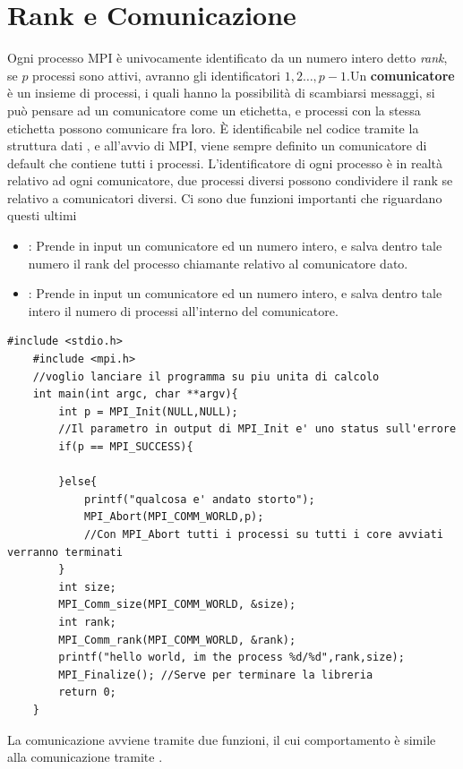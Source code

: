 \documentclass[10pt, letterpaper]{report}
\begin{document}
\section{Rank e Comunicazione}
Ogni processo MPI è univocamente identificato da un numero intero detto \textit{rank}, se $p$ processi sono 
attivi, avranno gli identificatori $1,2\dots,p-1$.\acc  Un \textbf{comunicatore} è un insieme di processi, i quali hanno 
la possibilità di scambiarsi messaggi, si può pensare ad un comunicatore come un etichetta, e processi con la stessa 
etichetta possono comunicare fra loro. 
È identificabile nel codice tramite la struttura dati , e all'avvio di MPI, viene sempre 
definito un comunicatore di default  che contiene tutti i processi.\acc 
L'identificatore di ogni processo è in realtà relativo ad ogni comunicatore, due processi diversi possono condividere il 
rank se relativo a comunicatori diversi. Ci sono due funzioni importanti che riguardano questi ultimi\begin{itemize}
    \item {} : Prende in input un comunicatore ed un numero intero, e 
    salva dentro tale numero il rank del processo chiamante relativo al comunicatore dato.
    \item {} : Prende in input un comunicatore ed un numero intero, e 
    salva dentro tale intero il numero di processi all'interno del comunicatore.
\end{itemize}
\begin{lstlisting}[style=CStyle]
    #include <stdio.h>
    #include <mpi.h>
    //voglio lanciare il programma su piu unita di calcolo
    int main(int argc, char **argv){
        int p = MPI_Init(NULL,NULL); 
        //Il parametro in output di MPI_Init e' uno status sull'errore
        if(p == MPI_SUCCESS){
        
        }else{
            printf("qualcosa e' andato storto");
            MPI_Abort(MPI_COMM_WORLD,p);
            //Con MPI_Abort tutti i processi su tutti i core avviati verranno terminati 
        }
        int size;
        MPI_Comm_size(MPI_COMM_WORLD, &size);
        int rank;
        MPI_Comm_rank(MPI_COMM_WORLD, &rank);
        printf("hello world, im the process %d/%d",rank,size);
        MPI_Finalize(); //Serve per terminare la libreria
        return 0;
    }
\end{lstlisting}
La comunicazione avviene tramite due funzioni, il cui comportamento è simile alla comunicazione tramite .\acc 
\end{document}
